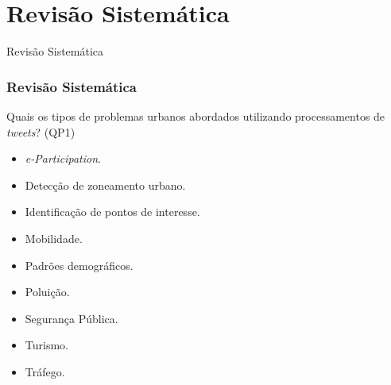 \documentclass{beamer}
\begin{document}
\section{Revisão Sistemática}
\begin{frame}
\Huge{\centerline{Revisão Sistemática}}
\end{frame}
\begin{frame}
\frametitle{Revisão Sistemática}
\begin{block}{Quais os tipos de problemas urbanos abordados utilizando processamentos de \textit{tweets}? (QP1)}
\begin{itemize}
\item \textit{e-Participation}.
\item Detecção de zoneamento urbano.
\item Identificação de pontos de interesse.
\item Mobilidade.
\item Padrões demográficos.
\item Poluição.
\item Segurança Pública.
\item Turismo.
\item Tráfego.
\end{itemize}
\end{block}
\end{frame}
\end{document}
